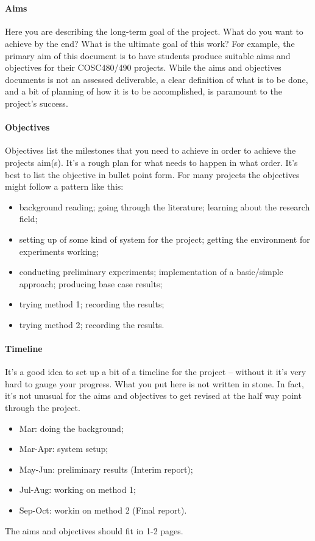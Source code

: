 \documentclass[12pt]{article}
\begin{document}
 \\

\paragraph{Aims}
Here you are describing the long-term goal of the project.  What do you want to achieve by the end?  What is the ultimate goal of this work?  For example, the primary aim of this document is to have students produce suitable aims and objectives for their COSC480/490 projects.  While the aims and objectives documents is not an assessed deliverable, a clear definition of what is to be done, and a bit of planning of how it is to be accomplished, is paramount to the project's success.  

\paragraph{Objectives}
Objectives list the milestones that you need to achieve in order to achieve the projects aim(s).  It's a rough plan for what needs to happen in what order.  It's best to list the objective in bullet point form.  For many projects the objectives might follow a pattern like this:    
\begin{itemize}[noitemsep]
\item background reading; going through the literature; learning about the research field;
\item setting up of some kind of system for the project; getting the environment for experiments working;
\item conducting preliminary experiments; implementation of a basic/simple approach; producing base case results;
\item trying method 1; recording the results;
\item trying method 2; recording the results.
\end{itemize}

\paragraph{Timeline} It's a good idea to set up a bit of a timeline for the project -- without it it's very hard to gauge your progress.  What you put here is not written in stone.  In fact, it's not unusual for the aims and objectives to get revised at the half way point through the project.
\begin{itemize}[noitemsep]
\item Mar: doing the background;
\item Mar-Apr: system setup;
\item May-Jun: preliminary results (Interim report);
\item Jul-Aug: working on method 1;
\item Sep-Oct: workin on method 2 (Final report).
\end{itemize}

\noindent
The aims and objectives should fit in 1-2 pages.
\end{document}
